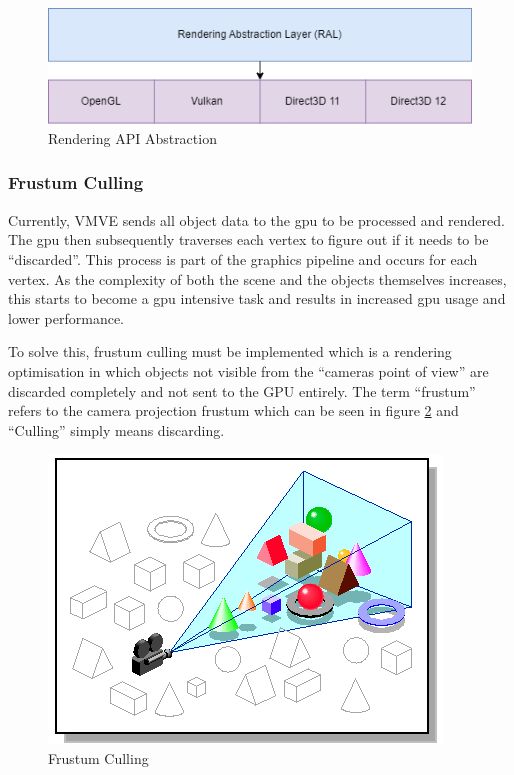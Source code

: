 \documentclass[11pt]{article}
\begin{document}
\begin{figure}[H]
  \centering
  \includegraphics[width=\textwidth]{images/api_abstraction.png}
  \caption{Rendering API Abstraction}
  \label{fig:api_abstraction}
\end{figure}

\subsubsection*{Frustum Culling}
Currently, VMVE sends all object data to the \gls*{gpu} to be processed and
rendered. The \gls*{gpu} then subsequently traverses each vertex to figure out if
it needs to be ``discarded''. This process is part of the graphics pipeline and
occurs for each vertex. As the complexity of both the scene and the objects
themselves increases, this starts to become a \gls*{gpu} intensive task and
results in increased \gls*{gpu} usage and lower performance.

To solve this, frustum culling must be implemented which is a rendering
optimisation in which objects not visible from the ``cameras point of view'' are
discarded completely and not sent to the GPU entirely. The term ``frustum'' refers
to the camera projection frustum which can be seen in figure
\ref{fig:frustum_culling} and ``Culling'' simply means discarding.

\begin{figure}[H]
  \centering
  \includegraphics[width=\textwidth]{images/frustum_culling.png}
  \caption{Frustum Culling \cite{frustum_culling}}
  \label{fig:frustum_culling}
\end{figure}
\end{document}
